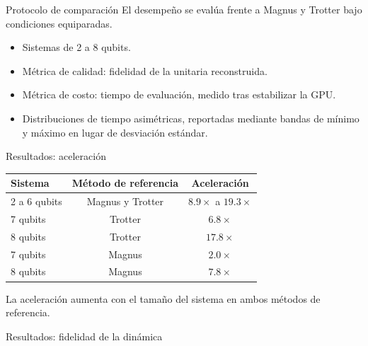 \documentclass[10pt,aspectratio=169]{beamer}
\begin{document}
\begin{frame}{Protocolo de comparación}
  El desempeño se evalúa frente a Magnus y Trotter bajo condiciones equiparadas.
  \pause
  \vfill
  \begin{itemize}
    \item Sistemas de 2 a 8 qubits.
    \item Métrica de calidad: fidelidad de la unitaria reconstruida.
    \item Métrica de costo: tiempo de evaluación, medido tras estabilizar la GPU.
    \item Distribuciones de tiempo asimétricas, reportadas mediante bandas de mínimo y máximo en lugar de desviación estándar.
  \end{itemize}
\end{frame}

\begin{frame}{Resultados: aceleración}
  \begin{center}
  \begin{tabular}{lcc}
    \toprule
    \textbf{Sistema} & \textbf{Método de referencia} & \textbf{Aceleración} \\
    \midrule
    2 a 6 qubits & Magnus y Trotter & $8.9\times$ a $19.3\times$ \\
    \midrule
    7 qubits & Trotter & $6.8\times$ \\
    8 qubits & Trotter & $17.8\times$ \\
    7 qubits & Magnus  & $2.0\times$ \\
    8 qubits & Magnus  & $7.8\times$ \\
    \bottomrule
  \end{tabular}
  \end{center}
  \vfill
  \pause
  La aceleración aumenta con el tamaño del sistema en ambos métodos de referencia. %
\end{frame}

\begin{frame}{Resultados: fidelidad de la dinámica}
  \begin{center}
  \end{center}
  \vfill
\end{frame}
\end{document}
